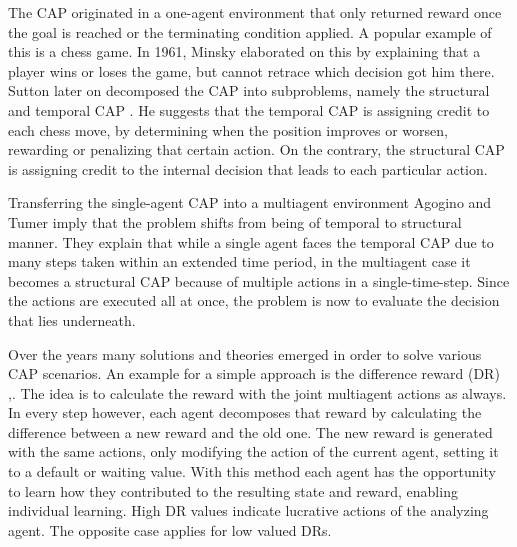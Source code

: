The CAP originated in a one-agent environment that only returned reward once the goal is reached or the terminating condition applied. A popular example of this is a chess game. In 1961, Minsky \cite{mi61} elaborated on this by explaining that a player wins or loses the game, but cannot retrace which decision got him there. Sutton later on decomposed the CAP into subproblems, namely the structural and temporal CAP \cite{su84}. He suggests that the temporal CAP is assigning credit to each chess move, by determining when the position improves or worsen, rewarding or penalizing that certain action. On the contrary, the structural CAP is assigning credit to the internal decision that leads to each particular action.

Transferring the single-agent CAP into a multiagent environment Agogino and Tumer \cite{agtu04} imply that the problem shifts from being of temporal to structural manner. They explain that while a single agent faces the temporal CAP due to many steps taken within an extended time period, in the multiagent case it becomes a structural CAP because of multiple actions in a single-time-step. Since the actions are executed all at once, the problem is now to evaluate the decision that lies underneath.

Over the years many solutions and theories emerged in order to solve various CAP scenarios. An example for a simple approach is the difference reward (DR) \cite{agtu04},\cite{ngku18}. The idea is to calculate the reward with the joint multiagent actions as always. In every step however, each agent decomposes that reward by calculating the difference between a new reward and the old one. The new reward is generated with the same actions, only modifying the action of the current agent, setting it to a default or waiting value. With this method each agent has the opportunity to learn how they contributed to the resulting state and reward, enabling individual learning. High DR values indicate lucrative actions of the analyzing agent. The opposite case applies for low valued DRs.

